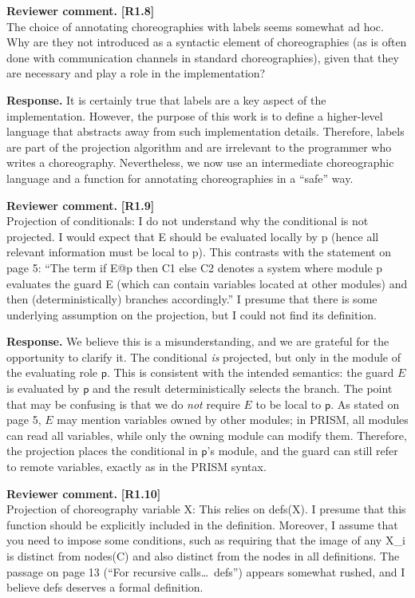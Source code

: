 \documentclass[11pt]{article}
\newcommand{\revcomment}[1]{%
  \begin{reviewercomment}
  \textbf{Reviewer comment.} #1
  \end{reviewercomment}
}
\newcommand{\revresponse}[2][]{%
  \par\noindent\textbf{Response.} #1 #2
}
\begin{document}
\revcomment{\textbf{[R1.8]}\\
The choice of annotating choreographies with labels seems somewhat
ad hoc. Why are they not introduced as a syntactic element of
choreographies (as is often done with communication channels in
standard choreographies), given that they are necessary and play a
role in the implementation?
}

\revresponse{ It is certainly true that labels are a key aspect of the
  implementation. However, the purpose of this work is to define a
  higher-level language that abstracts away from such implementation
  details. Therefore, labels are part of the projection algorithm and
  are irrelevant to the programmer who writes a
  choreography. Nevertheless, we now use an intermediate choreographic
  language and a function for annotating choreographies in a ``safe''
  way. }


\revcomment{\textbf{[R1.9]}\\
Projection of conditionals: I do not understand why the conditional
is not projected. I would expect that E should be evaluated locally
by p (hence all relevant information must be local to p). This
contrasts with the statement on page 5: ``The term if E@p then C1
else C2 denotes a system where module p evaluates the guard E
(which can contain variables located at other modules) and then
(deterministically) branches accordingly.'' I presume that there is
some underlying assumption on the projection, but I could not find
its definition.
}

\revresponse{
We believe this is a misunderstanding, and we are grateful for the opportunity to clarify it. The conditional \emph{is} projected, but only in the module of the evaluating role $\mathsf p$. This is consistent with the intended semantics: the guard $E$ is evaluated by $\mathsf p$ and the result deterministically selects the branch. The point that may be confusing is that we do \emph{not} require $E$ to be local to $\mathsf p$. As stated on page 5, $E$ may mention variables owned by other modules; in PRISM, all modules can read all variables, while only the owning module can modify them. Therefore, the projection places the conditional in $\mathsf p$'s module, and the guard can still refer to remote variables, exactly as in the PRISM syntax.
}

\revcomment{\textbf{[R1.10]}\\
Projection of choreography variable X: This relies on defs(X). I
presume that this function should be explicitly included in the
definition. Moreover, I assume that you need to impose some
conditions, such as requiring that the image of any X\_i is distinct
from nodes(C) and also distinct from the nodes in all definitions.
The passage on page 13 (``For recursive calls\ldots\ defs'') appears
somewhat rushed, and I believe defs deserves a formal definition.
}
\end{document}
